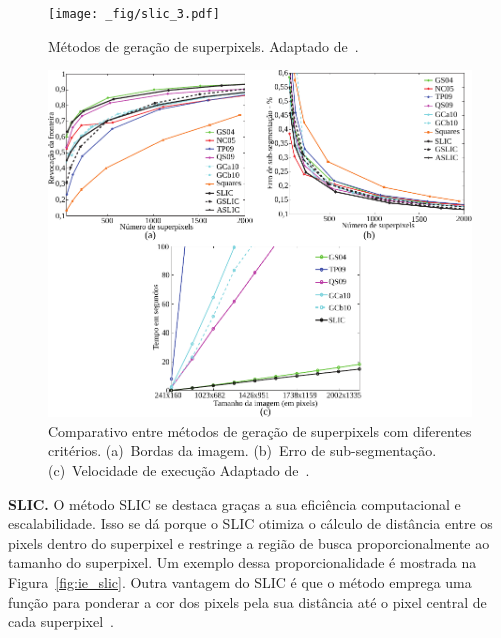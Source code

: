 \begin{figure}[!b]
    \centering
    \texttt{[image: \_fig/slic\_3.pdf]}
    \caption[Resultado dos métodos de geração de superpixels]{Métodos de geração de superpixels.
    Adaptado de~.}
    \label{fig:SLIC_3}
\end{figure}

\begin{figure}[!htb]
    \centering
    \includegraphics[scale=1]{_fig/slic.pdf}
    \caption[Comparativo entre métodos de geração de superpixels]{Comparativo entre métodos de geração de superpixels com diferentes critérios.
    (a)~Bordas da imagem.
    (b)~Erro de sub-segmentação.
    (c)~Velocidade de execução
    Adaptado de~.}
    \label{fig:SLIC}
\end{figure}


\noindent
\textbf{SLIC.}
O método SLIC se destaca graças a sua eficiência computacional e escalabilidade.
Isso se dá porque o SLIC otimiza o cálculo de distância entre os pixels dentro do superpixel e restringe a região de busca proporcionalmente ao tamanho do superpixel.
Um exemplo dessa proporcionalidade é mostrada na Figura~\ref{fig:ie_slic}.
Outra vantagem do SLIC é que o método emprega uma função para ponderar a cor dos pixels pela sua distância até o pixel central de cada superpixel~\cite{Achanta2012}.

